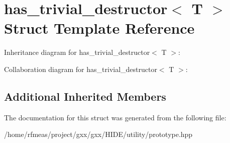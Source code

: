\hypertarget{structhas__trivial__destructor}{}\section{has\+\_\+trivial\+\_\+destructor$<$ T $>$ Struct Template Reference}
\label{structhas__trivial__destructor}


Inheritance diagram for has\+\_\+trivial\+\_\+destructor$<$ T $>$\+:


Collaboration diagram for has\+\_\+trivial\+\_\+destructor$<$ T $>$\+:
\subsection*{Additional Inherited Members}


The documentation for this struct was generated from the following file\+:\begin{DoxyCompactItemize}
\item 
/home/rfmeas/project/gxx/gxx/\+H\+I\+D\+E/utility/prototype.\+hpp\end{DoxyCompactItemize}
